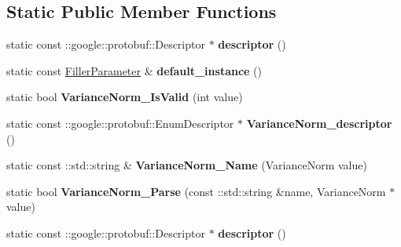\subsection*{Static Public Member Functions}
\begin{DoxyCompactItemize}
\item 
\mbox{\label{classcaffe_1_1_filler_parameter_aa281ab8ff39c1ce7ca73f5180472eab2}} 
static const \+::google\+::protobuf\+::\+Descriptor $\ast$ {\bfseries descriptor} ()
\item 
\mbox{\label{classcaffe_1_1_filler_parameter_a910e872de67f4bf8e23a6abb574ff9ad}} 
static const \mbox{\hyperlink{classcaffe_1_1_filler_parameter}{Filler\+Parameter}} \& {\bfseries default\+\_\+instance} ()
\item 
\mbox{\label{classcaffe_1_1_filler_parameter_ae221621b63dd60962d913c4b261c34ea}} 
static bool {\bfseries Variance\+Norm\+\_\+\+Is\+Valid} (int value)
\item 
\mbox{\label{classcaffe_1_1_filler_parameter_a0ad2e31a8c01f3b407854ddf0609734d}} 
static const \+::google\+::protobuf\+::\+Enum\+Descriptor $\ast$ {\bfseries Variance\+Norm\+\_\+descriptor} ()
\item 
\mbox{\label{classcaffe_1_1_filler_parameter_a4735cb33c39453c184a0b3a13590a8db}} 
static const \+::std\+::string \& {\bfseries Variance\+Norm\+\_\+\+Name} (Variance\+Norm value)
\item 
\mbox{\label{classcaffe_1_1_filler_parameter_a0c9cba0fb401bd9b7c85f17fe8631ac3}} 
static bool {\bfseries Variance\+Norm\+\_\+\+Parse} (const \+::std\+::string \&name, Variance\+Norm $\ast$value)
\item 
\mbox{\label{classcaffe_1_1_filler_parameter_a2659ea72c60fd2f615fd7c70f26aa2db}} 
static const \+::google\+::protobuf\+::\+Descriptor $\ast$ {\bfseries descriptor} ()
\item 
\mbox{\label{classcaffe_1_1_filler_parameter_a8ff7b16971d3ee75d22aac39e47d6d9d}} 

\end{DoxyCompactItemize}
